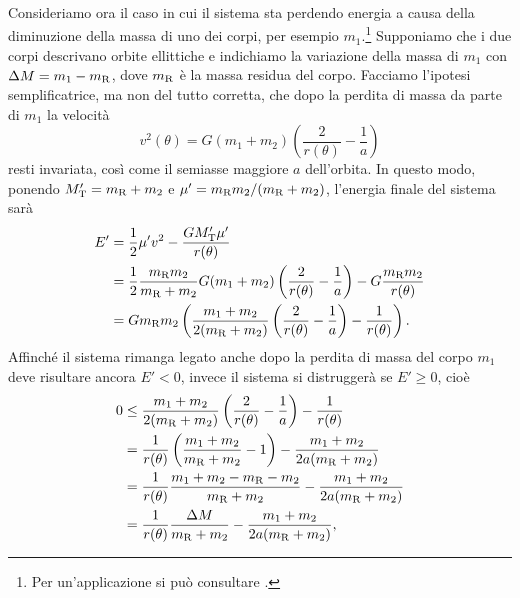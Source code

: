 {Consideriamo ora il caso in cui il sistema sta perdendo energia a causa della
diminuzione della massa di uno dei corpi, per esempio
$m_1$.\footnote{Per un'applicazione si può consultare
  \textcite{padmanabhan:stars}.}
Supponiamo che i due corpi descrivano orbite ellittiche e indichiamo la
variazione della massa di $m_1$ con $\Delta M = m_1 - m_\textup{R}$, dove
$m_\textup{R}$ è la massa residua del corpo. Facciamo l'ipotesi semplificatrice,
ma non del tutto corretta, che dopo la perdita di massa da parte di $m_1$ la
velocità
\begin{equation}
  v^2(\theta) = G(m_1 + m_2)
  \left(
    \frac{2}{r(\theta)} - \frac{1}{a}
  \right)
\end{equation}
resti invariata, così come il semiasse maggiore $a$ dell'orbita. In questo modo,
ponendo $M'_\textup{T}=m_\textup{R}+m_2$ e $\mu' = m_\textup{R}m_2/(m_\textup{R}
+ m_2)$, l'energia finale del sistema sarà
\begin{equation}
  \begin{split}
    E' &= \frac{1}{2}\mu'v^2 - \frac{GM'_\textup{T}\mu'}{r(\theta)} \\
    &= \frac{1}{2}\frac{m_\textup{R}m_2}{m_\textup{R} + m_2}G(m_1 + m_2)
    \left(
      \frac{2}{r(\theta)} - \frac{1}{a}
    \right) - G\frac{m_\textup{R}m_2}{r(\theta)} \\
    &= Gm_\textup{R}m_2
    \left(
      \frac{m_1 + m_2}{2(m_\textup{R} + m_2)}
      \left(
        \frac{2}{r(\theta)} - \frac{1}{a}
      \right) - \frac{1}{r(\theta)}
    \right).
  \end{split}
\end{equation}
Affinché il sistema rimanga legato anche dopo la perdita di massa del corpo
$m_1$ deve risultare ancora $E' < 0$, invece il sistema si distruggerà se $E'
\geq 0$, cioè
\begin{equation}
  \begin{split}
    0 &\leq \frac{m_1 + m_2}{2(m_\textup{R} + m_2)}
    \left(
      \frac{2}{r(\theta)} - \frac{1}{a}
    \right) - \frac{1}{r(\theta)} \\
    &= \frac{1}{r(\theta)}
    \left(
      \frac{m_1 + m_2}{m_\textup{R} + m_2} - 1
    \right) - \frac{m_1 + m_2}{2a(m_\textup{R} + m_2)} \\
    &= \frac{1}{r(\theta)}\frac{m_1 + m_2 - m_\textup{R} - m_2}{m_\textup{R} +
      m_2} - \frac{m_1 + m_2}{2a(m_\textup{R} + m_2)} \\
    &= \frac{1}{r(\theta)}\frac{\Delta M}{m_\textup{R} +
      m_2} - \frac{m_1 + m_2}{2a(m_\textup{R} + m_2)},

\end{split}
\end{equation}}
